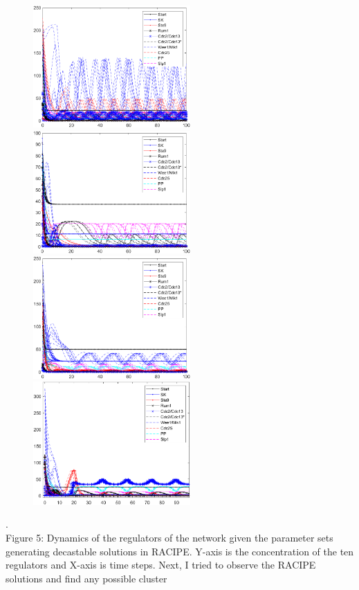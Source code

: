 \documentclass{article}
\begin{document}
\begin{figure}[H]
  \includegraphics[width=60mm, scale=0.5]{dynamics1.png}
  \includegraphics[width=60mm, scale=0.5]{dynamics2.png} 
  \includegraphics[width=60mm, scale=0.5]{dynamics3.png}
  \includegraphics[width=60mm, scale=0.5]{dynamics5.png}
\end{figure}
.\\
Figure 5: Dynamics of the regulators of the network given the parameter sets 
generating decastable solutions in RACIPE. Y-axis is the concentration of the 
ten regulators and X-axis is time steps.
\newline \newline 
Next, I tried to observe the RACIPE solutions and find any possible cluster 
\end{document}
